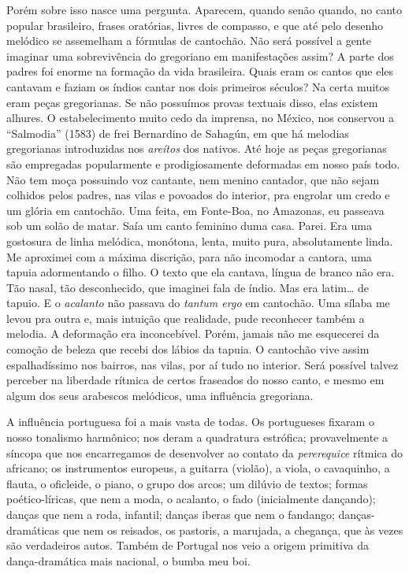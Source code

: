 Porém sobre isso nasce uma pergunta. Aparecem, quando senão quando, no
canto popular brasileiro, frases oratórias, livres de compasso, e que
até pelo desenho melódico se assemelham a fórmulas de cantochão. Não
será possível a gente imaginar uma sobrevivência do gregoriano em
manifestações assim? A parte dos padres foi enorme na formação da vida
brasileira. Quais eram os cantos que eles cantavam e faziam os índios
cantar nos dois primeiros séculos? Na certa muitos eram peças
gregorianas. Se não possuímos provas textuais disso, elas existem
alhures. O estabelecimento muito cedo da imprensa, no México, nos
conservou a ``Salmodia'' (1583) de frei Bernardino de Sahagún, em que há
melodias gregorianas introduzidas nos \textit{areítos} dos nativos. Até hoje as
peças gregorianas são empregadas popularmente e prodigiosamente
deformadas em nosso país todo. Não tem moça possuindo voz cantante, nem
menino cantador, que não sejam colhidos pelos padres, nas vilas e
povoados do interior, pra engrolar um credo e um glória em cantochão.
Uma feita, em Fonte-Boa, no Amazonas, eu passeava sob um solão de matar.
Saía um canto feminino duma casa. Parei. Era uma gostosura de linha
melódica, monótona, lenta, muito pura, absolutamente linda. Me aproximei
com a máxima discrição, para não incomodar a cantora, uma tapuia
adormentando o filho. O texto que ela cantava, língua de branco não era.
Tão nasal, tão desconhecido, que imaginei fala de índio. Mas era
latim\ldots{} de tapuio. E o \textit{acalanto} não passava do \textit{tantum ergo} em
cantochão. Uma sílaba me levou pra outra e, mais intuição que realidade,
pude reconhecer também a melodia. A deformação era inconcebível. Porém,
jamais não me esquecerei da comoção de beleza que recebi dos lábios da
tapuia. O cantochão vive assim espalhadíssimo nos bairros, nas vilas,
por aí tudo no interior. Será possível talvez perceber na liberdade
rítmica de certos fraseados do nosso canto, e mesmo em algum dos seus
arabescos melódicos, uma influência gregoriana.

A influência portuguesa foi a mais vasta de todas. Os portugueses
fixaram o nosso tonalismo harmônico; nos deram a quadratura estrófica;
provavelmente a síncopa que nos encarregamos de desenvolver ao contato
da \textit{pererequice} rítmica do africano; os instrumentos europeus, a guitarra
(violão), a viola, o cavaquinho, a flauta, o oficleide, o piano, o grupo
dos arcos; um dilúvio de textos; formas poético-líricas, que nem a moda,
o acalanto, o fado (inicialmente dançando); danças que nem a roda,
infantil; danças iberas que nem o fandango; danças-dramáticas que nem os
reisados, os pastoris, a marujada, a chegança, que às vezes são
verdadeiros autos. Também de Portugal nos veio a origem primitiva da
dança-dramática mais nacional, o bumba meu boi.

